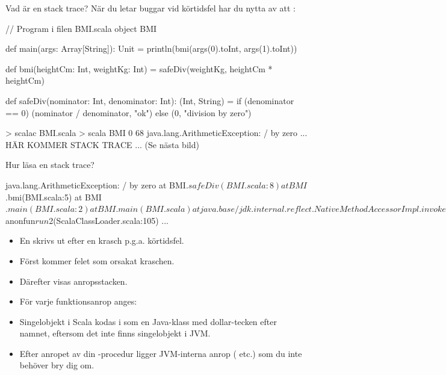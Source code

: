 \begin{Slide}{Vad är en stack trace?}\SlideFontSmall
När du letar buggar vid körtidsfel har du nytta av att   :
\begin{Code}
// Program i filen BMI.scala
object BMI { 
  def main(args: Array[String]): Unit = 
    println(bmi(args(0).toInt, args(1).toInt))

  def bmi(heightCm: Int, weightKg: Int) = 
    safeDiv(weightKg, heightCm * heightCm) 

  def safeDiv(nominator: Int, denominator: Int): (Int, String) = 
    if (denominator == 0) (nominator / denominator, "ok")
    else (0, "division by zero") 
}
\end{Code}
\begin{REPL}
> scalac BMI.scala 
> scala BMI 0 68
java.lang.ArithmeticException: / by zero
  ... HÄR KOMMER STACK TRACE ... (Se nästa bild)
\end{REPL}
\end{Slide}

\begin{Slide}{Hur läsa en stack trace?}
\begin{REPL}
  java.lang.ArithmeticException: / by zero
       at BMI$.safeDiv(BMI.scala:8)
       at BMI$.bmi(BMI.scala:5)
       at BMI$.main(BMI.scala:2)
       at BMI.main(BMI.scala)
       at java.base/jdk.internal.reflect.NativeMethodAccessorImpl.invoke0(Native Method)
       at java.base/jdk.internal.reflect.NativeMethodAccessorImpl.invoke(NativeMethodAccessorImpl.java:62)
       at java.base/jdk.internal.reflect.DelegatingMethodAccessorImpl.invoke(DelegatingMethodAccessorImpl.java:43)
       at java.base/java.lang.reflect.Method.invoke(Method.java:566)
       at scala.reflect.internal.util.ScalaClassLoader.$anonfun$run$2(ScalaClassLoader.scala:105)
  ...  
\end{REPL}
\begin{itemize}\SlideFontSmall
  \item En  skrivs ut efter en krasch p.g.a. körtidsfel.
  \item Först kommer felet som orsakat kraschen. 
  \item Därefter visas anropsstacken.
  \item För varje funktionsanrop anges: 
  \item Singelobjekt i Scala kodas i som en Java-klass med dollar-tecken efter namnet, eftersom det inte finns singelobjekt i JVM.
  \item Efter anropet av din -procedur ligger JVM-interna anrop ( etc.) som du inte behöver bry dig om.
\end{itemize}
\end{Slide}
  

